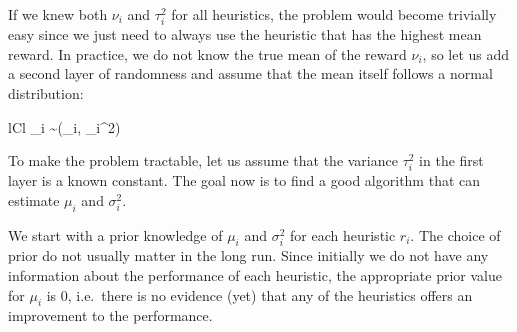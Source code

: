 \documentclass[fleqn,10pt,lineno]{wlpeerj} %
\newcommand{\Normal}{\mathcal{N}}
\begin{document}
If we knew both $\nu_i$ and $\tau_i^2$ for all heuristics, the problem would
become trivially easy since we just need to always use the heuristic that has
the highest mean reward. In practice, we do not know the true mean of the
reward $\nu_i$, so let us add a second layer of randomness and assume that
the mean itself follows a normal distribution:
	\begin{IEEEeqnarray}{lCl}
        \nu_i \sim \Normal(\mu_i, \sigma_i^2)
    \end{IEEEeqnarray}

To make the problem tractable, let us assume that the variance $\tau_i^2$ in
the first layer is a known constant. The goal now is to find a good algorithm
that can estimate $\mu_i$ and $\sigma_i^2$.

We start with a prior knowledge of $\mu_i$ and $\sigma_i^2$ for each heuristic
$r_i$. The choice of prior do not usually matter in the long run. Since
initially we do not have any information about the performance of each
heuristic, the appropriate prior value for $\mu_i$ is $0$, i.e.\ there is no
evidence (yet) that any of the heuristics offers an improvement to the
performance.
\end{document}
